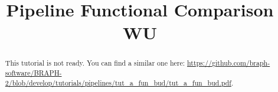 \documentclass[justified]{tufte-handout}
\title{Pipeline Functional Comparison WU}
\begin{document}
\maketitle

\begin{abstract}
\noindent
This tutorial is not ready. You can find a similar one here: \url{https://github.com/braph-software/BRAPH-2/blob/develop/tutorials/pipelines/tut_a_fun_bud/tut_a_fun_bud.pdf}.
\end{abstract}
\end{document}
